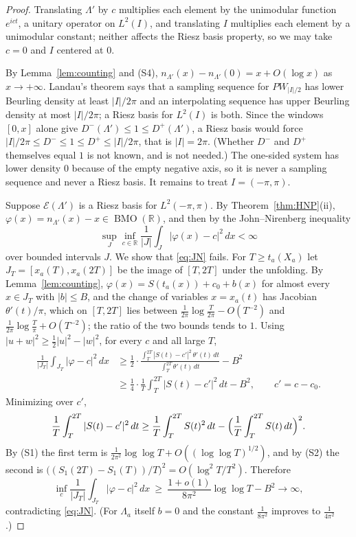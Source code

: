 \documentclass[11pt]{article}
\DeclareMathOperator{\BMO}{BMO}
\newcommand{\R}{\mathbb{R}}
\newcommand{\Lam}{\Lambda}
\newcommand{\E}{\mathcal{E}}
\begin{document}
\begin{proof}
Translating $\Lam'$ by $c$ multiplies each element by the unimodular function $e^{ict}$, a unitary operator on $L^2(I)$, and translating $I$ multiplies each element by a unimodular constant; neither affects the Riesz basis property, so we may take $c=0$ and $I$ centered at $0$.

By Lemma~\ref{lem:counting} and (S4), $n_{\Lam'}(x)-n_{\Lam'}(0)=x+O(\log x)$ as $x\to+\infty$. Landau's theorem \cite{Landau67} says that a sampling sequence for $PW_{|I|/2}$ has lower Beurling density at least $|I|/2\pi$ and an interpolating sequence has upper Beurling density at most $|I|/2\pi$; a Riesz basis for $L^2(I)$ is both. Since the windows $[0,x]$ alone give $D^-(\Lam')\le1\le D^+(\Lam')$, a Riesz basis would force $|I|/2\pi\le D^-\le1\le D^+\le|I|/2\pi$, that is $|I|=2\pi$. (Whether $D^-$ and $D^+$ themselves equal $1$ is not known, and is not needed.) The one-sided system has lower density $0$ because of the empty negative axis, so it is never a sampling sequence and never a Riesz basis. It remains to treat $I=(-\pi,\pi)$.

Suppose $\E(\Lam')$ is a Riesz basis for $L^2(-\pi,\pi)$. By Theorem~\ref{thm:HNP}(ii), $\varphi(x)=n_{\Lam'}(x)-x\in\BMO(\R)$, and then by the John--Nirenberg inequality
\begin{equation}\label{eq:JN}
\sup_J\inf_{c\in\R}\frac1{|J|}\int_J|\varphi(x)-c|^2\,dx<\infty
\end{equation}
over bounded intervals $J$. We show that \eqref{eq:JN} fails. For $T\ge t_a(X_a)$ let $J_T=[x_a(T),x_a(2T)]$ be the image of $[T,2T]$ under the unfolding. By Lemma~\ref{lem:counting}, $\varphi(x)=S(t_a(x))+c_0+b(x)$ for almost every $x\in J_T$ with $|b|\le B$, and the change of variables $x=x_a(t)$ has Jacobian $\theta'(t)/\pi$, which on $[T,2T]$ lies between $\frac1{2\pi}\log\frac{T}{2\pi}-O(T^{-2})$ and $\frac1{2\pi}\log\frac{T}{\pi}+O(T^{-2})$; the ratio of the two bounds tends to $1$. Using $|u+w|^2\ge\frac12|u|^2-|w|^2$, for every $c$ and all large $T$,
\begin{align*}
\frac1{|J_T|}\int_{J_T}|\varphi-c|^2\,dx
&\ge\frac12\cdot\frac{\int_T^{2T}|S(t)-c'|^2\,\theta'(t)\,dt}{\int_T^{2T}\theta'(t)\,dt}-B^2\\
&\ge\frac14\cdot\frac1T\int_T^{2T}|S(t)-c'|^2\,dt-B^2 ,\qquad c'=c-c_0 .
\end{align*}
Minimizing over $c'$,
\[
\frac1T\int_T^{2T}|S(t)-c'|^2\,dt\ge\frac1T\int_T^{2T}S(t)^2\,dt-\Bigl(\frac1T\int_T^{2T}S(t)\,dt\Bigr)^2 .
\]
By (S1) the first term is $\frac{1}{2\pi^2}\log\log T+O((\log\log T)^{1/2})$, and by (S2) the second is $\bigl((S_1(2T)-S_1(T))/T\bigr)^2=O(\log^2T/T^2)$. Therefore
\[
\inf_{c}\frac1{|J_T|}\int_{J_T}|\varphi-c|^2\,dx\ \ge\ \frac{1+o(1)}{8\pi^2}\log\log T-B^2\longrightarrow\infty ,
\]
contradicting \eqref{eq:JN}. (For $\Lam_a$ itself $b=0$ and the constant $\frac1{8\pi^2}$ improves to $\frac1{4\pi^2}$.)
\end{proof}
\end{document}
